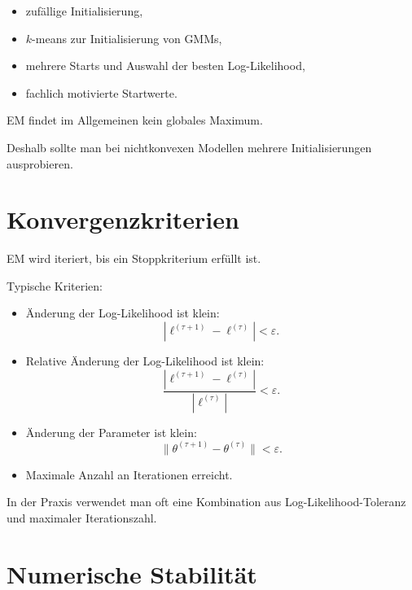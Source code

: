 \begin{itemize}
    \item zufällige Initialisierung,
    \item \(k\)-means zur Initialisierung von GMMs,
    \item mehrere Starts und Auswahl der besten Log-Likelihood,
    \item fachlich motivierte Startwerte.
\end{itemize}

\begin{examtipbox}
EM findet im Allgemeinen kein globales Maximum.

Deshalb sollte man bei nichtkonvexen Modellen mehrere Initialisierungen ausprobieren.
\end{examtipbox}

\section{Konvergenzkriterien}

EM wird iteriert, bis ein Stoppkriterium erfüllt ist.

Typische Kriterien:

\begin{itemize}
    \item Änderung der Log-Likelihood ist klein:
    \[
        |\ell^{(\tau+1)}-\ell^{(\tau)}|<\varepsilon.
    \]

    \item Relative Änderung der Log-Likelihood ist klein:
    \[
        \frac{
            |\ell^{(\tau+1)}-\ell^{(\tau)}|
        }{
            |\ell^{(\tau)}|
        }
        <
        \varepsilon.
    \]

    \item Änderung der Parameter ist klein:
    \[
        \|\theta^{(\tau+1)}-\theta^{(\tau)}\|<\varepsilon.
    \]

    \item Maximale Anzahl an Iterationen erreicht.
\end{itemize}

\begin{notebox}
In der Praxis verwendet man oft eine Kombination aus Log-Likelihood-Toleranz und maximaler Iterationszahl.
\end{notebox}

\section{Numerische Stabilität}

